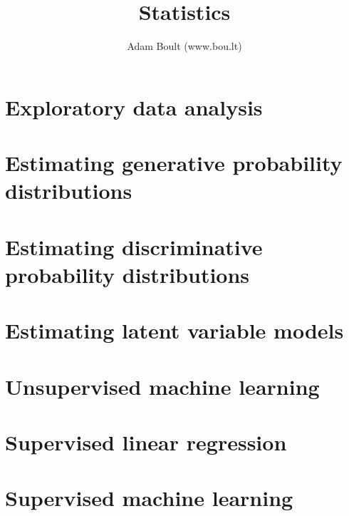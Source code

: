 \documentclass[oneside]{book}
\begin{document}
\author{Adam Boult (www.bou.lt)}
\title{Statistics}
\maketitle

\setcounter{tocdepth}{0}
\tableofcontents



\part{Exploratory data analysis}











\part{Estimating generative probability distributions}













\part{Estimating discriminative probability distributions}





\part{Estimating latent variable models}


\part{Unsupervised machine learning}



\part{Supervised linear regression}






\part{Supervised machine learning}

















\end{document}
